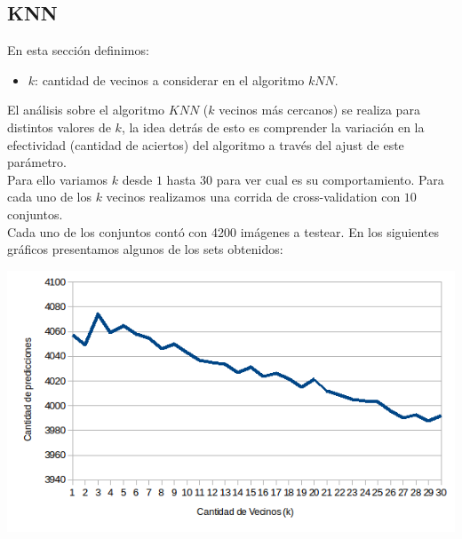 \subsection{KNN}
En esta sección definimos:
\begin{itemize}
	\item $k$: cantidad de vecinos a considerar en el algoritmo $kNN$.
\end{itemize}
El análisis sobre el algoritmo $KNN$ ($k$ vecinos más cercanos) se realiza para distintos valores de $k$, la idea detrás de esto es comprender la variación en la efectividad (cantidad de aciertos) del algoritmo a través del ajust de este parámetro.
\\
Para ello variamos $k$ desde $1$ hasta $30$ para ver cual es su comportamiento. Para cada uno de los $k$ vecinos realizamos una corrida de cross-validation con $10$ conjuntos.
\\
Cada uno de los conjuntos contó con 4200 imágenes a testear. En los siguientes gráficos presentamos algunos de los sets obtenidos:
\begin{center}
\includegraphics[scale=0.55]{nuevosResultados/knn/1.png}
\end{center}

